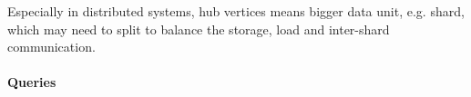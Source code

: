 
Especially in distributed systems, hub vertices means bigger data unit, e.g.
shard, which may need to split to balance the storage, load and inter-shard
communication.


\paragraph{Queries}
{\raggedright
}